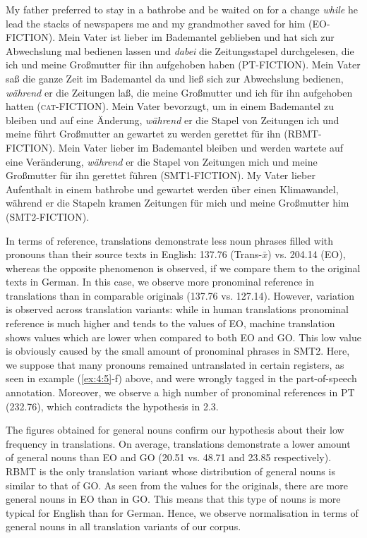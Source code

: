 \documentclass[output=paper]{LSP/langsci}
\begin{document}
\ea \label{ex:4:5}
\ea My father preferred to stay in a bathrobe and be waited on for a change \textit{while} he lead the stacks of newspapers me and my grandmother saved for him (EO-FICTION).
\ex Mein Vater ist lieber im Bademantel geblieben und hat sich zur Abwechslung mal bedienen lassen und \textit{dabei} die Zeitungsstapel durchgelesen, die ich und meine Großmutter für ihn aufgehoben haben (PT-FICTION).
\ex Mein Vater saß die ganze Zeit im Bademantel da und ließ sich zur Abwechslung bedienen, \textit{während} er die Zeitungen laß, die meine Großmutter und ich für ihn aufgehoben hatten (\textsc{cat}-FICTION).
\ex Mein Vater bevorzugt, um in einem Bademantel zu bleiben und auf eine Änderung, \textit{während} er die Stapel von Zeitungen ich und meine führt Großmutter an gewartet zu werden gerettet für ihn (RBMT-FICTION). 
\ex Mein Vater lieber im Bademantel bleiben und werden wartete auf eine Veränderung, \textit{während} er die Stapel von Zeitungen mich und meine Großmutter für ihn gerettet führen (SMT1-FICTION).
\ex My Vater lieber Aufenthalt in einem bathrobe und gewartet werden über einen Klimawandel, während er die Stapeln kramen Zeitungen für mich und meine Großmutter him (SMT2-FICTION).
\z
\z

In terms of reference, translations demonstrate less noun phrases filled with pronouns than their source texts in English: 137.76 (Trans-$\bar{x}$) vs. 204.14 (EO), whereas the opposite phenomenon is observed, if we compare them to the original texts in German. In this case, we observe more pronominal reference in translations than in comparable originals (137.76 vs. 127.14). However, variation is observed across translation variants: while in human translations pronominal reference is much higher and tends to the values of EO, machine translation shows values which are lower when compared to both EO and GO. This low value is obviously caused by the small amount of pronominal phrases in SMT2. Here, we suppose that many pronouns remained untranslated in certain registers, as seen in example (\ref{ex:4:5}-f) above, and were wrongly tagged in the part-of-speech annotation. Moreover, we observe a high number of pronominal references in PT (232.76), which contradicts the hypothesis in 2.3.

The figures obtained for general nouns confirm our hypothesis about their low frequency in translations. On average, translations demonstrate a lower amount of general nouns than EO and GO (20.51 vs. 48.71 and 23.85 respectively). RBMT is the only translation variant whose distribution of general nouns is similar to that of GO. As seen from the values for the originals, there are more general nouns in EO than in GO. This means that this type of nouns is more typical for English than for German. Hence, we observe normalisation in terms of general nouns in all translation variants of our corpus. 
\end{document}
